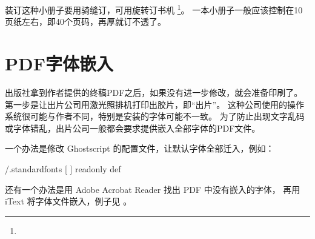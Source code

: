 装订这种小册子要用骑缝订，可用旋转订书机
\footnote{ \quad {}}。
一本小册子一般应该控制在10页纸左右，即40个页码，再厚就订不透了。

\section{PDF字体嵌入}
\label{sec:embedFont}
出版社拿到作者提供的终稿PDF之后，如果没有进一步修改，就会准备印刷了。
第一步是让出片公司用激光照排机打印出胶片，即“出片”。
这种公司使用的操作系统很可能与作者不同，特别是安装的字体可能不一致。
为了防止出现文字乱码或字体错乱，出片公司一般都会要求提供嵌入全部字体的PDF文件。

一个办法是修改 Ghostscript 的配置文件，让默认字体全部迁入，例如：
\begin{Codex}[label=/usr/share/ghostscript/???/Resource/Init/gs_pdfwr.ps]
/.standardfonts [
] readonly def
\end{Codex}

还有一个办法是用 Adobe Acrobat Reader 找出 PDF 中没有嵌入的字体，
再用 iText 将字体文件嵌入，例子见 。
